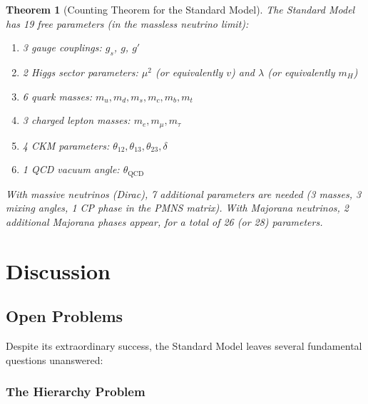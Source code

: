 \documentclass[12pt]{article}
\newtheorem{theorem}{Theorem}[section]
\theoremstyle{definition}
\theoremstyle{remark}
\begin{document}
\begin{theorem}[Counting Theorem for the Standard Model]
\label{thm:counting}
The Standard Model has 19 free parameters (in the massless neutrino limit):
\begin{enumerate}
    \item 3 gauge couplings: $g_s$, $g$, $g'$
    \item 2 Higgs sector parameters: $\mu^2$ (or equivalently $v$) and $\lambda$ (or equivalently $m_H$)
    \item 6 quark masses: $m_u, m_d, m_s, m_c, m_b, m_t$
    \item 3 charged lepton masses: $m_e, m_\mu, m_\tau$
    \item 4 CKM parameters: $\theta_{12}, \theta_{13}, \theta_{23}, \delta$
    \item 1 QCD vacuum angle: $\theta_{\mathrm{QCD}}$
\end{enumerate}
With massive neutrinos (Dirac), 7 additional parameters are needed (3 masses, 3 mixing angles, 1 CP phase in the PMNS matrix). With Majorana neutrinos, 2 additional Majorana phases appear, for a total of 26 (or 28) parameters.
\end{theorem}

\section{Discussion}
\label{sec:discussion}

\subsection{Open Problems}

Despite its extraordinary success, the Standard Model leaves several fundamental questions unanswered:

\subsubsection{The Hierarchy Problem}
\end{document}
